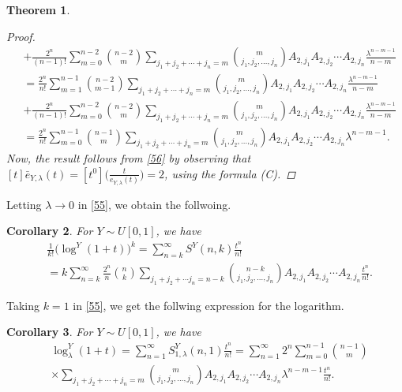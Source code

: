 \documentclass[a4paper,11pt]{amsart}
\newtheorem{theorem}{Theorem}[section]
\newtheorem{corollary}[theorem]{Corollary}
\begin{document}
\begin{theorem}
\begin{proof}
\begin{equation}
\begin{aligned}
&+\frac{2^{n}}{(n-1)!}\sum_{m=0}^{n-2}\binom{n-2}{m}\sum_{j_1+j_2+\cdots+j_n=m}\binom{m}{j_1,j_2,\dots,j_n}A_{2,j_1}A_{2,j_2}\cdots A_{2,j_n}\frac{\lambda^{n-m-1}}{n-m}\\
&=\frac{2^{n}}{n!}\sum_{m=1}^{n-1}\binom{n-2}{m-1}\sum_{j_1+j_2+\cdots+j_n=m}\binom{m}{j_1,j_2,\dots,j_n}A_{2,j_1}A_{2,j_2}\cdots A_{2,j_n}\frac{\lambda^{n-m-1}}{n-m} \\
&+\frac{2^{n}}{(n-1)!}\sum_{m=0}^{n-2}\binom{n-2}{m}\sum_{j_1+j_2+\cdots+j_n=m}\binom{m}{j_1,j_2,\dots,j_n}A_{2,j_1}A_{2,j_2}\cdots A_{2,j_n}\frac{\lambda^{n-m-1}}{n-m}\\
&=\frac{2^{n}}{n!}\sum_{m=0}^{n-1}\binom{n-1}{m}\sum_{j_1+j_2+\cdots+j_n=m}\binom{m}{j_1,j_2,\dots,j_n}A_{2,j_1}A_{2,j_2}\cdots A_{2,j_n}\lambda^{n-m-1}.
\end{aligned}
\end{equation}
Now, the result follows from \eqref{56} by observing that $[t] \bar{e}_{Y,\lambda}(t)=[t^{0}]\big(\frac{t}{e_{Y,\lambda}(t)}\big)=2 $, using the formula (C).
\end{proof}
\end{theorem}

Letting $\lambda \rightarrow 0$ in \eqref{55}, we obtain the follwoing.
\begin{corollary}
For $Y \sim U[0,1]$, we have
\begin{align*}
&\frac{1}{k!}\big(\log^{Y}(1+t)\big)^{k}=\sum_{n=k}^{\infty}S^{Y}(n,k)\frac{t^{n}}{n!} \\
&=k\sum_{n=k}^{\infty}\frac{2^{n}}{n}\binom{n}{k}\sum_{j_1+j_2+\cdots j_n=n-k}\binom{n-k}{j_1,j_2,\dots,j_n} A_{2,j_1}A_{2,j_2}\cdots A_{2,j_n}\frac{t^{n}}{n!}.
\end{align*}
\end{corollary}
Taking $k=1$ in \eqref{55}, we get the follwing expression for the logarithm. 
\begin{corollary}
For $Y \sim U[0,1]$, we have
\begin{align*}
&\log_{\lambda}^{Y}(1+t)=\sum_{n=1}^{\infty}S_{1,\lambda}^{Y}(n,1)\frac{t^{n}}{n!}=\sum_{n=1}^{\infty}2^{n}\sum_{m=0}^{n-1}\binom{n-1}{m} \\
&\times \sum_{j_1+j_2+\cdots+j_n=m}\binom{m}{j_1,j_2,\dots,j_n}A_{2,j_1}A_{2,j_2}\cdots A_{2,j_n}\lambda^{n-m-1}\frac{t^n}{n!}.
\end{align*}
\end{corollary}
\end{document}
